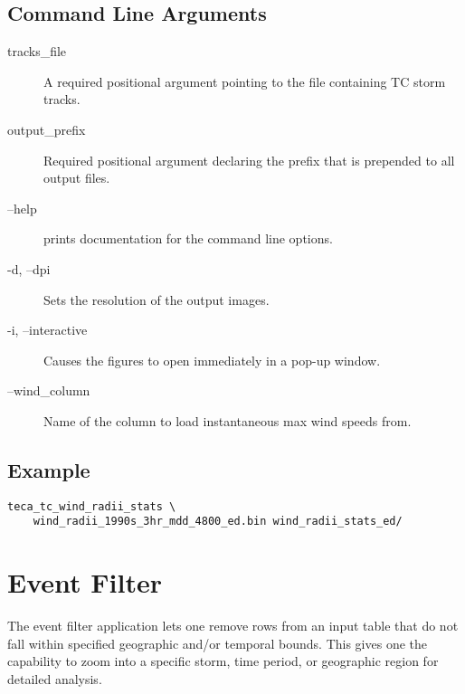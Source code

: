 \documentclass[a4paper,10pt,DIV=12]{scrreprt}
\begin{document}
\subsection{Command Line Arguments}
\begin{description}
\item[tracks\_file] A required positional argument pointing to the file containing TC storm tracks.
\item[output\_prefix] Required positional argument declaring the prefix that is prepended to all output files.
\item[--help] prints documentation for the command line options.
\item[-d, --dpi] Sets the resolution of the output images.
\item[-i, --interactive] Causes the figures to open immediately in a pop-up window.
\item[--wind\_column] Name of the column to load instantaneous max wind speeds from.
\end{description}

\subsection{Example}
\begin{verbatim}
teca_tc_wind_radii_stats \
    wind_radii_1990s_3hr_mdd_4800_ed.bin wind_radii_stats_ed/
\end{verbatim}

\section{Event Filter}
The event filter application lets one remove rows from an input table that do not fall within specified geographic and/or temporal bounds. This gives one the capability to zoom into a specific storm, time period, or geographic region for detailed analysis.
\end{document}

